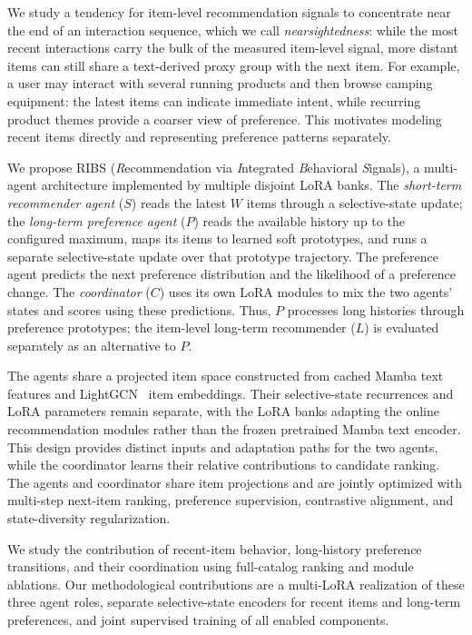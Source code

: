 ﻿\documentclass[sigconf,anonymous,review]{acmart}
\begin{document}
We study a tendency for item-level recommendation signals to concentrate near the end of an interaction sequence, which we call \emph{nearsightedness}: while the most recent interactions carry the bulk of the measured item-level signal, more distant items can still share a text-derived proxy group with the next item. For example, a user may interact with several running products and then browse camping equipment: the latest items can indicate immediate intent, while recurring product themes provide a coarser view of preference. This motivates modeling recent items directly and representing preference patterns separately.

We propose RIBS (\emph{R}ecommendation via \emph{I}ntegrated \emph{B}ehavioral \emph{S}ignals), a multi-agent architecture implemented by multiple disjoint LoRA banks. The \emph{short-term recommender agent} ($S$) reads the latest $W$ items through a selective-state update; the \emph{long-term preference agent} ($P$) reads the available history up to the configured maximum, maps its items to learned soft prototypes, and runs a separate selective-state update over that prototype trajectory. The preference agent predicts the next preference distribution and the likelihood of a preference change. The \emph{coordinator} ($C$) uses its own LoRA modules to mix the two agents' states and scores using these predictions. Thus, $P$ processes long histories through preference prototypes; the item-level long-term recommender ($L$) is evaluated separately as an alternative to $P$.

The agents share a projected item space constructed from cached Mamba text features and LightGCN~\citep{LightGCN} item embeddings. Their selective-state recurrences and LoRA parameters remain separate, with the LoRA banks adapting the online recommendation modules rather than the frozen pretrained Mamba text encoder. This design provides distinct inputs and adaptation paths for the two agents, while the coordinator learns their relative contributions to candidate ranking. The agents and coordinator share item projections and are jointly optimized with multi-step next-item ranking, preference supervision, contrastive alignment, and state-diversity regularization.

We study the contribution of recent-item behavior, long-history preference transitions, and their coordination using full-catalog ranking and module ablations. Our methodological contributions are a multi-LoRA realization of these three agent roles, separate selective-state encoders for recent items and long-term preferences, and joint supervised training of all enabled components.
\end{document}
